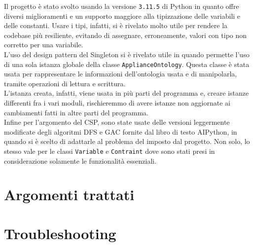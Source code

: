 \documentclass[12pt, letterpaper]{article}
\begin{document}
Il progetto è stato svolto usando la versione \texttt{3.11.5} di Python in quanto offre diversi
miglioramenti e un supporto maggiore alla tipizzazione delle variabili e delle constanti.
Usare i tipi, infatti, si è rivelato molto utile per rendere la codebase più resiliente, evitando di
assegnare, erroneamente, valori con tipo non corretto per una variabile. \\

\noindent L'uso del design pattern del Singleton si è rivelato utile in quando permette l'uso di
una sola istanza globale della classe \texttt{ApplianceOntology}. Questa classe è stata usata per
rappresentare le informazioni dell'ontologia usata e di manipolarla, tramite operazioni di lettura e
scrittura. \\

\noindent L'istanza creata, infatti, viene usata in più parti del programma e, creare istanze differenti
fra i vari moduli, rischieremmo di avere istanze non aggiornate ai cambiamenti fatti in altre parti del
programma. \\

\noindent Infine per l'argomento del CSP, sono state usate delle versioni leggermente modificate degli
algoritmi DFS e GAC fornite dal libro di testo AIPython, in quando si è scelto di adattarle al problema del
imposto dal progetto. Non solo, lo stesso vale per le classi \texttt{Variable} e \texttt{Contraint} dove sono
stati presi in considerazione solamente le funzionalità essenziali.



\section{Argomenti trattati}





\section{Troubleshooting}
\end{document}

